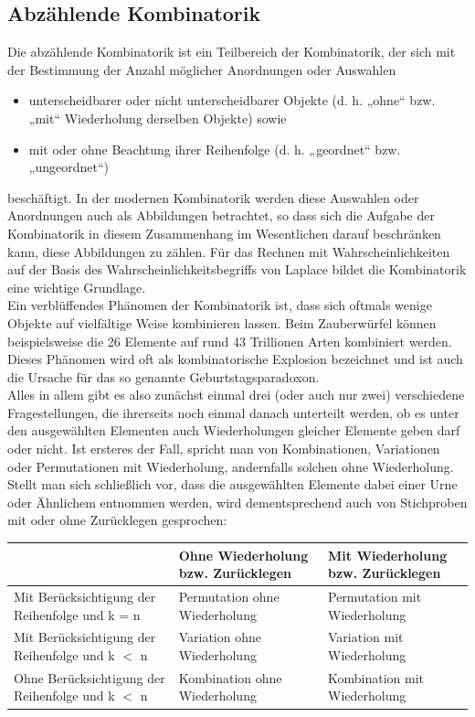 \documentclass[a4paper,10pt,DIV9, BCOR12mm, oneside,openright,openbib]{scrreprt}
\theoremstyle{definition}
\theoremstyle{plain}
\begin{document}
\subsection{Abzählende Kombinatorik}
Die abzählende Kombinatorik ist ein Teilbereich der Kombinatorik, der sich mit der Bestimmung der Anzahl möglicher Anordnungen oder Auswahlen
\begin{itemize}
 \item unterscheidbarer oder nicht unterscheidbarer Objekte (d. h. „ohne“ bzw. „mit“ Wiederholung derselben Objekte) sowie
 \item mit oder ohne Beachtung ihrer Reihenfolge (d. h. „geordnet“ bzw. „ungeordnet“)
\end{itemize}
beschäftigt. In der modernen Kombinatorik werden diese Auswahlen oder Anordnungen auch als Abbildungen betrachtet, so dass sich die Aufgabe der Kombinatorik in diesem Zusammenhang im Wesentlichen darauf beschränken kann, diese Abbildungen zu zählen. Für das Rechnen mit Wahrscheinlichkeiten auf der Basis des Wahrscheinlichkeitsbegriffs von Laplace bildet die Kombinatorik eine wichtige Grundlage.\\
Ein verblüffendes Phänomen der Kombinatorik ist, dass sich oftmals wenige Objekte auf vielfältige Weise kombinieren lassen. Beim Zauberwürfel können beispielsweise die 26 Elemente auf rund 43 Trillionen Arten kombiniert werden. Dieses Phänomen wird oft als kombinatorische Explosion bezeichnet und ist auch die Ursache für das so genannte Geburtstagsparadoxon.\\
Alles in allem gibt es also zunächst einmal drei (oder auch nur zwei) verschiedene Fragestellungen, die ihrerseits noch einmal danach unterteilt werden, ob es unter den ausgewählten Elementen auch Wiederholungen gleicher Elemente geben darf oder nicht. Ist ersteres der Fall, spricht man von Kombinationen, Variationen oder Permutationen mit Wiederholung, andernfalls solchen ohne Wiederholung. Stellt man sich schließlich vor, dass die ausgewählten Elemente dabei einer Urne oder Ähnlichem entnommen werden, wird dementsprechend auch von Stichproben mit oder ohne Zurücklegen gesprochen:\\
{\small 
\begin{tabularx}{\columnwidth}{|X|X|X|}
\hline  & Ohne Wiederholung bzw. Zurücklegen & Mit Wiederholung bzw. Zurücklegen \\ 
\hline Mit Berücksichtigung der Reihenfolge
und k = n & Permutation ohne Wiederholung & Permutation mit Wiederholung \\ 
\hline Mit Berücksichtigung der Reihenfolge
und k $ < $ n & Variation ohne Wiederholung & Variation mit Wiederholung \\ 
\hline Ohne Berücksichtigung der Reihenfolge
und k $ < $ n & Kombination ohne Wiederholung & Kombination mit Wiederholung \\ 
\hline 
\end{tabularx}}
\end{document}
